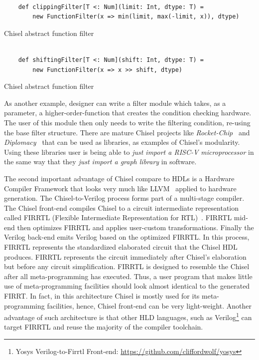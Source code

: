\begin{listing}[ht]
    \begin{verbatim}

    def clippingFilter[T <: Num](limit: Int, dtype: T) =
        new FunctionFilter(x => min(limit, max(-limit, x)), dtype)

    \end{verbatim}
    \caption{Chisel abstract function filter}
    \label{listing:chisel_example_f2}
\end{listing}

\begin{listing}[ht]
    \begin{verbatim}

    def shiftingFilter[T <: Num](shift: Int, dtype: T) =
        new FunctionFilter(x => x >> shift, dtype)

    \end{verbatim}
    \caption{Chisel abstract function filter}
    \label{listing:chisel_example_f3}
\end{listing}


As another example, designer can write a filter module which takes, as a parameter, a higher-order-function that creates the condition checking hardware.
The user of this module then only needs to write the filtering condition, re-using the base filter structure.
There are mature Chisel projects like \emph{Rocket-Chip~\cite{rocket-chip}} and \emph{Diplomacy~\cite{diplomacy}} that can be used as libraries, as examples of Chisel's modularity.
Using these libraries user is being able to \emph{just import a RISC-V microprocessor} in the same way that they \emph{just import a graph library} in software.

The second important advantage of Chisel compare to HDLs is a Hardware Compiler Framework that looks very much like LLVM~\cite{llvm} applied to hardware generation.
The Chisel-to-Verilog process forms part of a multi-stage compiler.
The Chisel front-end compiles Chisel to a circuit intermediate representation called FIRRTL (Flexible Intermediate Representation for RTL)~\cite{firrtl}.
FIRRTL mid-end then optimizes FIRRTL and applies user-custom transformations.
Finally the Verilog back-end emits Verilog based on the optimized FIRRTL.
In this process, FIRRTL represents the standardized elaborated circuit that the Chisel HDL produces.
FIRRTL represents the circuit immediately after Chisel's elaboration but before any circuit simplification.
FIRRTL is designed to resemble the Chisel after all meta-programming has executed. Thus, a user program that makes little use of meta-programming facilities should look almost identical to the generated FIRRT.
In fact, in this architecture Chisel is mostly used for its meta-programming facilities, hence, Chisel front-end can be very light-weight.
Another advantage of such architecture is that other HLD languages, such as Verilog\footnote{Yosys Verilog-to-Firrtl Front-end: \url{https://github.com/cliffordwolf/yosys}} can target FIRRTL and reuse the majority of the compiler toolchain.

